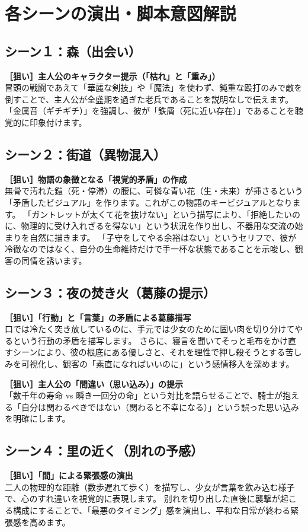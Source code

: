 \clearpage\section{各シーンの演出・脚本意図解説}
\subsection{シーン１：森（出会い）}
\textbf{［狙い］主人公のキャラクター提示（「枯れ」と「重み」）} \\
冒頭の戦闘であえて「華麗な剣技」や「魔法」を使わず、鈍重な殴打のみで敵を倒すことで、主人公が全盛期を過ぎた老兵であることを説明なしで伝えます。
「金属音（ギチギチ）」を強調し、彼が「鉄屑（死に近い存在）」であることを聴覚的に印象付けます。

\subsection{シーン２：街道（異物混入）}
\textbf{［狙い］物語の象徴となる「視覚的矛盾」の作成} \\
無骨で汚れた鎧（死・停滞）の腰に、可憐な青い花（生・未来）が挿さるという「矛盾したビジュアル」を作ります。これがこの物語のキービジュアルとなります。
「ガントレットが太くて花を抜けない」という描写により、「拒絶したいのに、物理的に受け入れざるを得ない」という状況を作り出し、不器用な交流の始まりを自然に描きます。
「子守をしてやる余裕はない」というセリフで、彼が冷徹なのではなく、自分の生命維持だけで手一杯な状態であることを示唆し、観客の同情を誘います。

\subsection{シーン３：夜の焚き火（葛藤の提示）}
\textbf{［狙い］「行動」と「言葉」の矛盾による葛藤描写} \\
口では冷たく突き放しているのに、手元では少女のために固い肉を切り分けてやるという行動の矛盾を描写します。
さらに、寝言を聞いてそっと毛布をかけ直すシーンにより、彼の根底にある優しさと、それを理性で押し殺そうとする苦しみを可視化し、観客の「素直になればいいのに」という感情移入を深めます。

\textbf{［狙い］主人公の「間違い（思い込み）」の提示} \\
「数千年の寿命 vs 瞬き一回分の命」という対比を語らせることで、騎士が抱える「自分は関わるべきではない（関わると不幸になる）」という誤った思い込みを明確にします。

\subsection{シーン４：里の近く（別れの予感）}
\textbf{［狙い］「間」による緊張感の演出} \\
二人の物理的な距離（数歩遅れて歩く）を描写し、少女が言葉を飲み込む様子で、心のすれ違いを視覚的に表現します。
別れを切り出した直後に襲撃が起こる構成にすることで、「最悪のタイミング」感を演出し、平和な日常が終わる緊張感を高めます。

